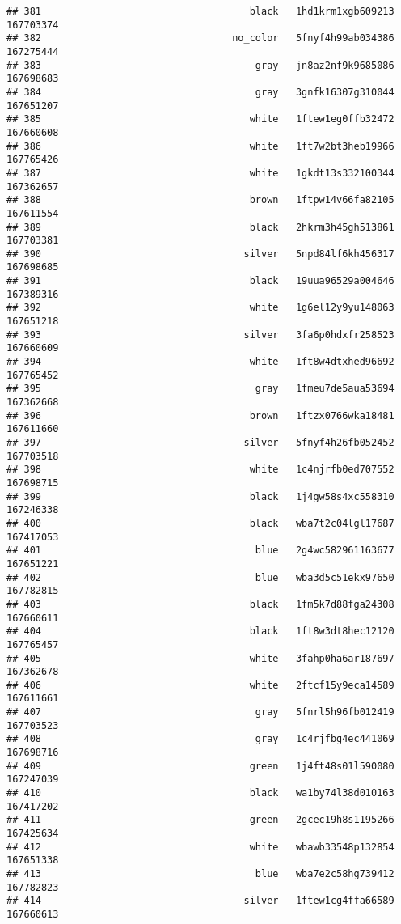 \documentclass[
]{article}
\begin{document}
\begin{verbatim}
## 381                                    black   1hd1krm1xgb609213 167703374
## 382                                 no_color   5fnyf4h99ab034386 167275444
## 383                                     gray   jn8az2nf9k9685086 167698683
## 384                                     gray   3gnfk16307g310044 167651207
## 385                                    white   1ftew1eg0ffb32472 167660608
## 386                                    white   1ft7w2bt3heb19966 167765426
## 387                                    white   1gkdt13s332100344 167362657
## 388                                    brown   1ftpw14v66fa82105 167611554
## 389                                    black   2hkrm3h45gh513861 167703381
## 390                                   silver   5npd84lf6kh456317 167698685
## 391                                    black   19uua96529a004646 167389316
## 392                                    white   1g6el12y9yu148063 167651218
## 393                                   silver   3fa6p0hdxfr258523 167660609
## 394                                    white   1ft8w4dtxhed96692 167765452
## 395                                     gray   1fmeu7de5aua53694 167362668
## 396                                    brown   1ftzx0766wka18481 167611660
## 397                                   silver   5fnyf4h26fb052452 167703518
## 398                                    white   1c4njrfb0ed707552 167698715
## 399                                    black   1j4gw58s4xc558310 167246338
## 400                                    black   wba7t2c04lgl17687 167417053
## 401                                     blue   2g4wc582961163677 167651221
## 402                                     blue   wba3d5c51ekx97650 167782815
## 403                                    black   1fm5k7d88fga24308 167660611
## 404                                    black   1ft8w3dt8hec12120 167765457
## 405                                    white   3fahp0ha6ar187697 167362678
## 406                                    white   2ftcf15y9eca14589 167611661
## 407                                     gray   5fnrl5h96fb012419 167703523
## 408                                     gray   1c4rjfbg4ec441069 167698716
## 409                                    green   1j4ft48s01l590080 167247039
## 410                                    black   wa1by74l38d010163 167417202
## 411                                    green   2gcec19h8s1195266 167425634
## 412                                    white   wbawb33548p132854 167651338
## 413                                     blue   wba7e2c58hg739412 167782823
## 414                                   silver   1ftew1cg4ffa66589 167660613

\end{verbatim}
\end{document}
